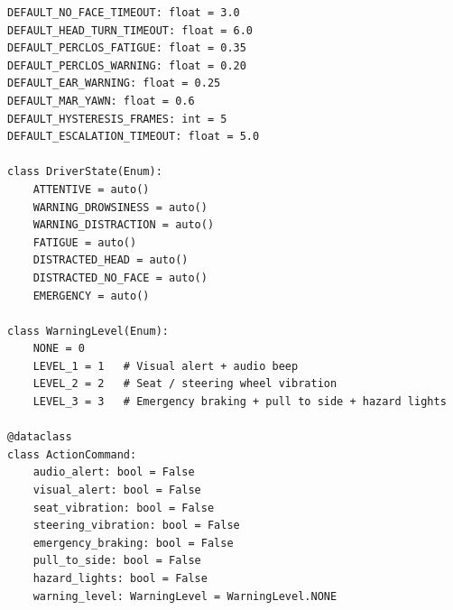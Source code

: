 \documentclass[12pt,a4paper]{report}
\begin{document}
\begin{lstlisting}[style=python, caption={Constantes et enums FSM (ecu\_decision.py)}, label=lst:ecu_constants]
DEFAULT_NO_FACE_TIMEOUT: float = 3.0
DEFAULT_HEAD_TURN_TIMEOUT: float = 6.0
DEFAULT_PERCLOS_FATIGUE: float = 0.35
DEFAULT_PERCLOS_WARNING: float = 0.20
DEFAULT_EAR_WARNING: float = 0.25
DEFAULT_MAR_YAWN: float = 0.6
DEFAULT_HYSTERESIS_FRAMES: int = 5
DEFAULT_ESCALATION_TIMEOUT: float = 5.0

class DriverState(Enum):
    ATTENTIVE = auto()
    WARNING_DROWSINESS = auto()
    WARNING_DISTRACTION = auto()
    FATIGUE = auto()
    DISTRACTED_HEAD = auto()
    DISTRACTED_NO_FACE = auto()
    EMERGENCY = auto()

class WarningLevel(Enum):
    NONE = 0
    LEVEL_1 = 1   # Visual alert + audio beep
    LEVEL_2 = 2   # Seat / steering wheel vibration
    LEVEL_3 = 3   # Emergency braking + pull to side + hazard lights

@dataclass
class ActionCommand:
    audio_alert: bool = False
    visual_alert: bool = False
    seat_vibration: bool = False
    steering_vibration: bool = False
    emergency_braking: bool = False
    pull_to_side: bool = False
    hazard_lights: bool = False
    warning_level: WarningLevel = WarningLevel.NONE
\end{lstlisting}
\end{document}

